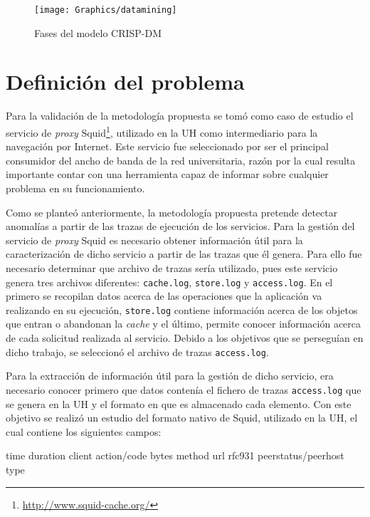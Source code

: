 \begin{figure}[!h]
 \begin{center} 
  \texttt{[image: Graphics/datamining]} 
 \end{center}
 \caption{Fases del modelo CRISP-DM}
 \label{fig:datamining}
\end{figure}

\section{Definición del problema}
Para la validación de la metodología propuesta\cite{Gonzalez2008} se tomó como
caso de estudio el servicio de \textit{proxy}
Squid\footnote{\url{http://www.squid-cache.org/}}, utilizado en la UH como
intermediario para la navegación por Internet. Este servicio fue seleccionado
por ser el principal consumidor del ancho de banda de la red universitaria,
razón por la cual resulta importante contar con una herramienta capaz de
informar sobre cualquier problema en su funcionamiento. 

Como se planteó anteriormente, la metodología propuesta pretende detectar
anomalías a partir de las trazas de ejecución de los servicios. Para la gestión
del servicio de \textit{proxy} Squid es necesario obtener información útil para
la caracterización de dicho servicio a partir de las trazas que él genera. Para
ello fue necesario determinar que archivo de trazas sería utilizado, pues este
servicio genera tres archivos diferentes: \texttt{cache.log}, \texttt{store.log}
y \texttt{access.log}. En el primero se recopilan datos acerca de las
operaciones que la aplicación va realizando en su ejecución, \texttt{store.log}
contiene información acerca de los objetos que entran o abandonan la
\textit{cache} y el último, permite conocer información acerca de cada solicitud
realizada al servicio. Debido a los objetivos que se perseguían en dicho
trabajo, se seleccionó el archivo de trazas \texttt{access.log}.

Para la extracción de información útil para la gestión de dicho servicio, era
necesario conocer primero que datos contenía el fichero de trazas
\texttt{access.log} que se genera en la UH y el formato en que es almacenado
cada elemento. Con este objetivo se realizó un estudio del formato nativo de
Squid, utilizado en la UH, el cual contiene los siguientes campos:

\begin{center}
\scriptsize\ttfamily time duration client action/code bytes method url rfc931 
peerstatus/peerhost type
\end{center}

